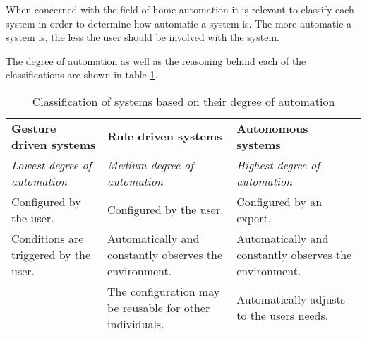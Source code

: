 When concerned with the field of home automation it is relevant to classify each system in order to determine how automatic a system is. The more automatic a system is, the less the user should be involved with the system.

The degree of automation as well as the reasoning behind each of the classifications are shown in table \ref{tbl:system-categories}.

\begin{table}[h]
\centering
\caption{Classification of systems based on their degree of automation}
\label{tbl:system-categories}
\begin{tabularx}{\textwidth}{XXX}
\textbf{Gesture driven systems} & \textbf{Rule driven systems} & \textbf{Autonomous systems} \\
\textit{Lowest degree of automation}
&
\textit{Medium degree of automation}
& 
\textit{Highest degree of automation}\\
Configured by the user.
&
Configured by the user.
& 
Configured by an expert.\\
Conditions are triggered by the user.
&
Automatically and constantly observes the environment.
&
Automatically and constantly observes the environment.\\
~
&
The configuration may be reusable for other individuals.
&
Automatically adjusts to the users needs.\\
\end{tabularx}
\end{table}

